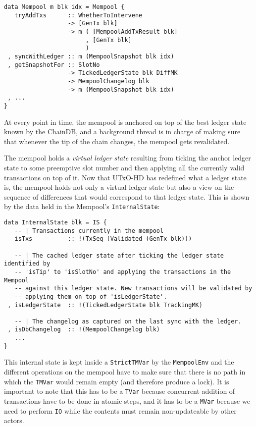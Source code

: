 \documentclass[11pt,a4paper]{article}
\theoremstyle{definition}
\begin{document}
\begin{lstlisting}
data Mempool m blk idx = Mempool {
   tryAddTxs      :: WhetherToIntervene
                  -> [GenTx blk]
                  -> m ( [MempoolAddTxResult blk]
                       , [GenTx blk]
                       )
 , syncWithLedger :: m (MempoolSnapshot blk idx)
 , getSnapshotFor :: SlotNo
                  -> TickedLedgerState blk DiffMK
                  -> MempoolChangelog blk
                  -> m (MempoolSnapshot blk idx)
 , ...
}
\end{lstlisting}

At every point in time, the mempool is anchored on top of the best ledger state
known by the ChainDB, and a background thread is in charge of making sure that
whenever the tip of the chain changes, the mempool gets revalidated.

The mempool holds a \emph{virtual ledger state} resulting from ticking the
anchor ledger state to some preemptive slot number and then applying all the
currently valid transactions on top of it. Now that UTxO-HD has redefined what a
ledger state is, the mempool holds not only a virtual ledger state but also a
view on the sequence of differences that would correspond to that ledger state.
This is shown by the data held in the Mempool's \texttt{InternalState}:

\begin{lstlisting}
data InternalState blk = IS {
   -- | Transactions currently in the mempool
   isTxs          :: !(TxSeq (Validated (GenTx blk)))

   -- | The cached ledger state after ticking the ledger state identified by
   -- 'isTip' to 'isSlotNo' and applying the transactions in the Mempool
   -- against this ledger state. New transactions will be validated by
   -- applying them on top of 'isLedgerState'.
 , isLedgerState  :: !(TickedLedgerState blk TrackingMK)

   -- | The changelog as captured on the last sync with the ledger.
 , isDbChangelog  :: !(MempoolChangelog blk)
   ...
}
\end{lstlisting}

This internal state is kept inside a \texttt{StrictTMVar} by the
\texttt{MempoolEnv} and the different operations on the mempool have to make
sure that there is no path in which the \texttt{TMVar} would remain empty (and
therefore produce a lock). It is important to note that this has to be a
\texttt{TVar} because concurrent addition of transactions have to be done in
atomic steps, and it has to be a \texttt{MVar} because we need to perform
\texttt{IO} while the contents must remain non-updateable by other actors.
\end{document}
